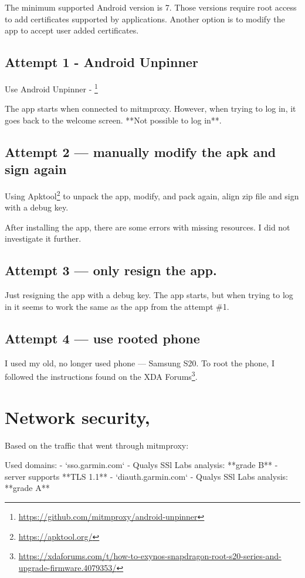 The minimum supported Android version is 7.
Those versions require root access to add certificates supported by applications.
Another option is to modify the app to accept user added certificates.

\subsection*{Attempt 1 - Android Unpinner}
Use Android Unpinner - \footnote{\url{https://github.com/mitmproxy/android-unpinner}}

The app starts when connected to mitmproxy.
However, when trying to log in, it goes back to the welcome screen.
**Not possible to log in**.

\subsection*{Attempt 2 — manually modify the apk and sign again}

Using Apktool\footnote{\url{https://apktool.org/}} to unpack the app, modify, and pack again, align zip file and sign with a debug key.

After installing the app, there are some errors with missing resources.
I did not investigate it further.

\subsection*{Attempt 3 — only resign the app.}
Just resigning the app with a debug key.
The app starts, but when trying to log in it seems to work the same as the app from the attempt \#1.

\subsection*{Attempt 4 — use rooted phone}
I used my old, no longer used phone — Samsung S20.
To root the phone, I followed the instructions found on the XDA Forums\footnote{\url{https://xdaforums.com/t/how-to-exynos-snapdragon-root-s20-series-and-upgrade-firmware.4079353/}}.

\section{Network security,}
Based on the traffic that went through mitmproxy:

Used domains:
- `sso.garmin.com` - Qualys SSl Labs analysis: **grade B**
- server supports **TLS 1.1**
- `diauth.garmin.com` - Qualys SSl Labs analysis: **grade A**

